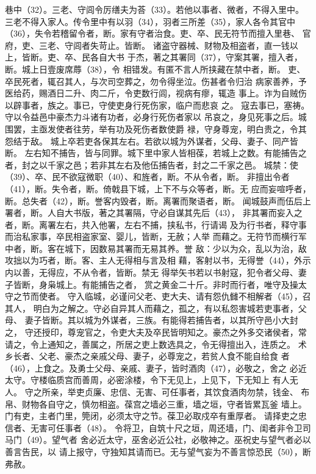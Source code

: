 \documentclass[12pt,UTF8]{ctexbook}
\begin{document}
巷中（32）。三老、守闾令厉缮夫为荅（33）。若他以事者、微者，不得入里中。 
三老不得入家人。传令里中有以羽（34），羽者三所差（35），家人各令其官中 
（36），失令若稽留令者，断。家有守者治食。吏、卒、民无符节而擅入里巷、 
官府，吏、三老、守闾者失苛止。皆断。 
诸盗守器械、财物及相盗者，直一钱以上，皆断。吏、卒、民各自大书 
于杰，著之其署同（37），守案其署，擅入者，断。城上日壹废席蓐（38），令 
相错发。有匿不言人所挟藏在禁中者，断。 
吏、卒民死者，辄召其人，与次司空葬之，勿令得坐泣。伤甚者令归治 
病家善养，予医给药，赐酒日二升、肉二斤，令吏数行闾，视病有瘳，辄造 
事上。诈为自贼伤以辟事者，族之。事已，守使吏身行死伤家，临户而悲哀 
之。 
寇去事已，塞祷。守以令益邑中豪杰力斗诸有功者，必身行死伤者家以 
吊哀之，身见死事之后。城围罢，主亟发使者往劳，举有功及死伤者数使爵 
禄，守身尊宠，明白贵之，令其怨结于敌。 
城上卒若吏各保其左右。若欲以城为外谋者，父母、妻子、同产皆断。 
左右知不捕告，皆与同罪。城下里中家人皆相葆，若城上之数。有能捕告之 
者，封之以千家之邑；若非其左右及他伍捕告者，封之二千家之邑。 
城禁：使（39）、卒、民不欲寇微职（40）、和旌者，断。不从令者，断。 
非擅出令者（41），断。失令者，断。倚戟县下城，上下不与众等者，断。无 
应而妄喧呼者，断。总失者（42），断。誉客内毁者，断。离署而聚语者，断。 
闻城鼓声而伍后上署者，断。人自大书版，著之其署隔，守必自谋其先后（43）， 
非其署而妄入之者，断。离署左右，共入他署，左右不捕，挟私书，行请谒 
及为行书者，释守事而治私家事，卒民相盗家室、婴儿，皆断，无赦；人举 
而藉之。无符节而横行军中者，断。客在城下，因数易其署而无易其养。誉 
敌：少以为众，乱以为治，敌攻拙以为巧者，断。客、主人无得相与言及相 
藉，客射以书，无得誉（44），外示内以善，无得应，不从令者，皆断。禁无 
得举矢书若以书射寇，犯令者父母、妻子皆断，身枭城上。有能捕告之者， 
赏之黄金二十斤。非时而行者，唯守及操太守之节而使者。 
守入临城，必谨问父老、吏大夫、请有怨仇雠不相解者（45），召其人， 
明白为之解之。守必自异其人而藉之，孤之，有以私怨害城若吏事者，父母、 
妻子皆断。其以城为外谋者，三族。有能得若捕告者，以其所守邑小大封之， 
守还授印，尊宠官之，令吏大夫及卒民皆明知之。豪杰之外多交诸侯者，常 
请之，令上通知之，善属之，所居之吏上数选具之，令无得擅出入，连质之。 
术乡长者、父老、豪杰之亲戚父母、妻子，必尊宠之，若贫人食不能自给食 
者（46），上食之。及勇士父母、亲戚、妻子，皆时酒肉（47），必敬之，舍之 
必近太守。守楼临质宫而善周，必密涂楼，令下无见上，上见下，下无知上 
有人无人。 
守之所亲，举吏贞廉、忠信、无害、可任事者，其饮食酒肉勿禁，钱金、 
布帛、财物各自守之，慎勿相盗。葆宫之墙必三重，墙之垣，守者皆累瓦釜 
墙上。门有吏，主者门里，筦闭，必须太守之节。葆卫必取戍卒有重厚者。 
请择吏之忠信者、无害可任事者（48）。 
令将卫，自筑十尺之垣，周还墙，门、闺者非令卫司马门（49）。望气者 
舍必近太守，巫舍必近公社，必敬神之。巫祝史与望气者必以善言告民，以 
请上报守，守独知其请而已。无与望气妄为不善言惊恐民（50），断弗赦。 
\end{document}
